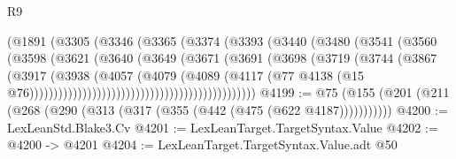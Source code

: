 \begin{lexlean}{R9}
\begin{coremodule}
                                          (@1891
                                            (@3305
                                              (@3346
                                                (@3365
                                                  (@3374
                                                    (@3393
                                                      (@3440
                                                        (@3480
                                                          (@3541
                                                            (@3560
                                                              (@3598
                                                                (@3621
                                                                  (@3640
                                                                    (@3649
                                                                      (@3671
                                                                        (@3691
                                                                          (@3698
                                                                            (@3719
                                                                              (@3744
                                                                                (@3867
                                                                                  (@3917
                                                                                    (@3938
                                                                                      (@4057
                                                                                        (@4079
                                                                                          (@4089
                                                                                            (@4117
                                                                                              (@77
                                                                                                @4138
                                                                                                (@15
                                                                                                  @76)))))))))))))))))))))))))))))))))))))))))))))))
@4199 := @75 (@155 (@201 (@211 (@268 (@290 (@313 (@317 (@355 (@442 (@475 (@622 @4187)))))))))))
@4200 := LexLeanStd.Blake3.Cv
@4201 := LexLeanTarget.TargetSyntax.Value
@4202 := @4200 -> @4201
@4204 := LexLeanTarget.TargetSyntax.Value.adt @50

\end{coremodule}
\end{lexlean}
